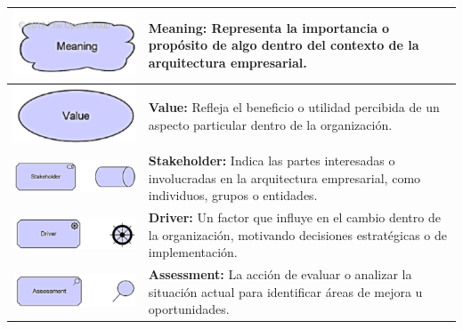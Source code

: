 \begin{longtable}{|c|p{8cm}|}
\endlastfoot
\includegraphics{apendices/ARCHI/strategy/meaning.png} & 
\textbf{Meaning:} Representa la importancia o propósito de algo dentro del contexto de la arquitectura empresarial. \\
\hline
\includegraphics{apendices/ARCHI/strategy/value.png} & 
\textbf{Value:} Refleja el beneficio o utilidad percibida de un aspecto particular dentro de la organización. \\
\hline
\includegraphics{apendices/ARCHI/strategy/stakeholder.png} & 
\textbf{Stakeholder:} Indica las partes interesadas o involucradas en la arquitectura empresarial, como individuos, grupos o entidades. \\
\hline
\includegraphics{apendices/ARCHI/strategy/driver.png} & 
\textbf{Driver:} Un factor que influye en el cambio dentro de la organización, motivando decisiones estratégicas o de implementación. \\
\hline
\includegraphics{apendices/ARCHI/strategy/assessment.png} & 
\textbf{Assessment:} La acción de evaluar o analizar la situación actual para identificar áreas de mejora u oportunidades. \\

\end{longtable}
